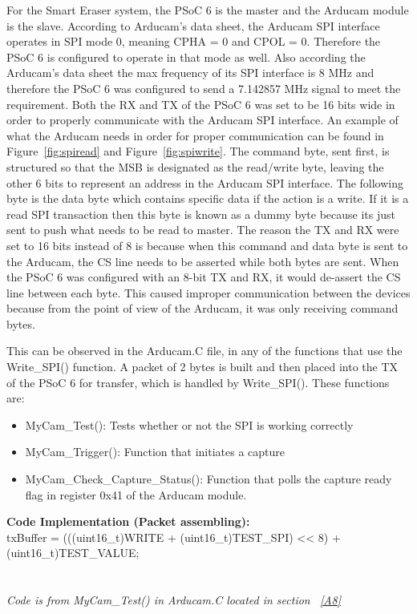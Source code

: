 \setlength{\parindent}{2.5ex} 
For the Smart Eraser system, the PSoC 6 is the master and the Arducam module is the slave. According to Arducam's data sheet, the Arducam SPI interface operates in SPI mode 0, meaning CPHA = 0 and CPOL = 0. Therefore the PSoC 6 is configured to operate in that mode as well. Also according the Arducam's data sheet the max frequency of its SPI interface is 8 MHz and therefore the PSoC 6 was configured to send a 7.142857 MHz signal to meet the requirement. Both the RX and TX of the PSoC 6 was set to be 16 bits wide in order to properly communicate with the Arducam SPI interface. An example of what the Arducam needs in order for proper communication can be found in Figure~\ref{fig:spiread} and Figure~\ref{fig:spiwrite}. The command byte, sent first, is structured so that the MSB is designated as the read/write byte, leaving the other 6 bits to represent an address in the Arducam SPI interface. The following byte is the data byte which contains specific data if the action is a write. If it is a read SPI transaction then this byte is known as a dummy byte because its just sent to push what needs to be read to master. The reason the TX and RX were set to 16 bits instead of 8 is because when this command and data byte is sent to the Arducam, the CS line needs to be asserted while both bytes are sent. When the PSoC 6 was configured with an 8-bit TX and RX, it would de-assert the CS line between each byte. This caused improper communication between the devices because from the point of view of the Arducam, it was only receiving command bytes.\par
\setlength{\parindent}{2.5ex}
This can be observed in the Arducam.C file, in any of the functions that use the Write\_SPI() function. A packet of 2 bytes is built and then placed into the TX of the PSoC 6 for transfer, which is handled by Write\_SPI(). These functions are: \\

\begin{itemize}
	\item MyCam\_Test(): Tests whether or not the SPI is working correctly 
	\item MyCam\_Trigger(): Function that initiates a capture 
	\item MyCam\_Check\_Capture\_Status(): Function that polls the capture ready flag in register 0x41 of the Arducam module. \\
\end{itemize}

\noindent \textbf{Code Implementation (Packet assembling):}\\ 
txBuffer = (((uint16\_t)WRITE + (uint16\_t)TEST\_SPI) << 8) + (uint16\_t)TEST\_VALUE;\\
\\\\
\textit{Code is from MyCam\_Test() in Arducam.C located in section ~\ref{A8}}\\\\

